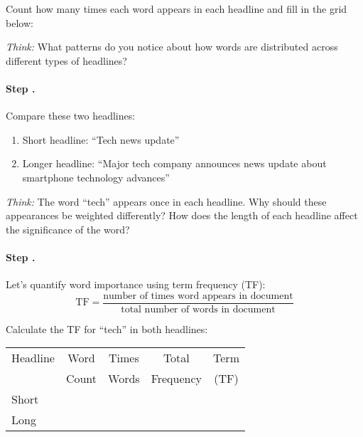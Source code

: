 \documentclass[a4paper,14pt]{extarticle}
\newcounter{exercisecount}
\newcounter{stepcount}[exercisecount]
\newcommand{\step}{\stepcounter{stepcount}\paragraph{Step \theexercisecount.\thestepcount}}
\newcommand{\think}[1]{
    \begin{mdframed}[backgroundcolor=thinkcolor,linewidth=0.5pt]
    \textit{Think:} #1
    \end{mdframed}}
\begin{document}
Count how many times each word appears in each headline and fill in the grid below:
\begin{center}
\end{center}

\think{What patterns do you notice about how words are distributed across different types of headlines?}

\step Compare these two headlines:
\begin{enumerate}[label=\roman*.]
    \item Short headline: ``Tech news update''
    \item Longer headline: ``Major tech company announces news update about smartphone technology advances''
\end{enumerate}

\think{The word ``tech'' appears once in each headline. Why should these appearances be weighted differently? How does the length of each headline affect the significance of the word?}

\step Let's quantify word importance using term frequency (TF):
\[ \text{TF} = \frac{\text{number of times word appears in document}}{\text{total number of words in document}} \]

Calculate the TF for ``tech'' in both headlines:
\begin{center}
\begin{tabular}{|l|c|c|c|c|}
    \hline
    Headline & Word & Times & Total & Term \\
     & Count & Words & Frequency & (TF) \\
    \hline
    Short & & & & \\ \hline
    Long & & & & \\ \hline
\end{tabular}
\end{center}
\end{document}
